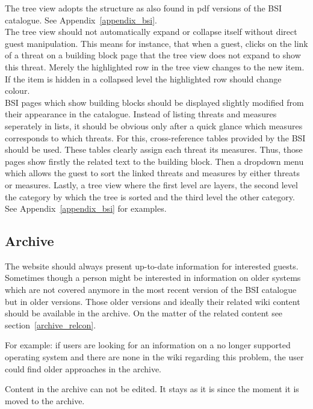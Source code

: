 \begin{tcolorbox}[breakable,colback=red!10,colframe=red!40!black,title=UPDATE 13/11/2017]
The tree view adopts the structure as also found in pdf versions of the BSI catalogue. 
See Appendix~\ref{appendix_bsi}.\\
The tree view should not automatically expand or collapse itself without direct guest manipulation.
This means for instance, that when a guest, clicks on the link of a threat on a building block page that the tree view does not expand to show this threat.
Merely the highlighted row in the tree view changes to the new item.
If the item is hidden in a collapsed level the highlighted row should change colour.
\\
BSI pages which show building blocks should be displayed slightly modified from their appearance in the catalogue.
Instead of listing threats and measures seperately in lists, it should be obvious only after a quick glance which measures corresponds to which threats.
For this, cross-reference tables provided by the BSI should be used.
These tables clearly assign each threat its measures.
Thus, those pages show firstly the related text to the building block.
Then a dropdown menu which allows the guest to sort the linked threats and measures by either threats or measures.
Lastly, a tree view where the first level are layers, the second level the category by which the tree is sorted and the third level the other category.
See Appendix~\ref{appendix_bsi} for examples.
\end{tcolorbox}


\subsection{Archive} 
\label{archive}
The website should always present up-to-date information for interested guests.
Sometimes though a person might be interested in information on older systems which are not covered anymore in the most recent version of the BSI catalogue but in older versions.
Those older versions and ideally their related wiki content should be available in the archive. 
On the matter of the related content see section~\ref{archive_relcon}.

For example: if users are looking for an information on a no longer supported operating system and there are none in the wiki regarding this problem, the user could find older approaches in the archive. 

\begin{tcolorbox}[breakable,colback=red!14,colframe=red!40!black,title=UPDATE 19/11/2017]
Content in the archive can not be edited.
It stays as it is since the moment it is moved to the archive.
\end{tcolorbox}


